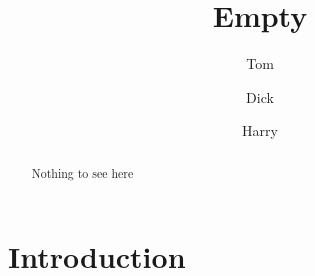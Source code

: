 \documentclass{SMR}
\title{Empty}
\author{Tom \and Dick \and Harry}
\begin{document}
\maketitle

\begin{abstract}
Nothing to see here
\end{abstract}

\section{Introduction}


\end{document}
